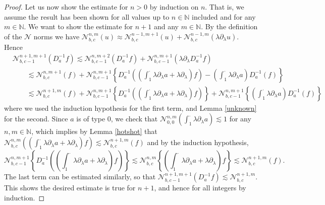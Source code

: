 \documentclass[11 pt]{amsart}
\theoremstyle{definition}
\theoremstyle{remark}
\numberwithin{equation}{section}
\begin{document}
\begin{proof}
Let us now show the estimate for $n>0$ by induction on $n$. That is, we assume the result has been shown for all values up to $n \in \mathbb{N}$ included and for any $m \in \mathbb{N}$. We want to show the estimate for $n+1$ and any $m \in \mathbb{N}$. By the definition of the $\mathcal N$ norms we have $\mathcal N^{n,m}_{b,c}(u)\approx \mathcal N^{n-1,m+1}_{b,c}(u)+\mathcal N^{n-1,m}_{b,c}(\lambda \partial_\lambda u)$. Hence
\begin{align*}
& \mathcal N^{n+1,m+1}_{b,c-1}(D_a^{-1}f)\lesssim \mathcal N^{n,m+2}_{b,c-1}(D_a^{-1}f)+\mathcal N^{n,m+1}_{b,c-1}(\lambda\partial_{\lambda}D_a^{-1}f)\\
&\qquad  \lesssim \mathcal N^{n,m+1}_{b,c}(f)+\mathcal N^{n,m+1}_{b,c-1}\left\{D_a^{- 1} \left( \left( \int_1^\cdot \lambda \partial_{\lambda} a +
    \lambda \partial_{\lambda} \right) f \right)-\left( \int_1^\cdot \lambda \partial_{\lambda} a \right) D_a^{- 1} (f) \right\}\\
    &\qquad  \lesssim \mathcal N^{n+1,m}_{b,c}(f)+\mathcal N^{n,m+1}_{b,c-1}\left\{D_a^{- 1} \left( \left( \int_1^\cdot \lambda \partial_{\lambda} a +
    \lambda \partial_{\lambda} \right) f \right)\right\}+\mathcal N^{n,m+1}_{b,c-1}\left\{\left( \int_1^\cdot \lambda \partial_{\lambda} a \right) D_a^{- 1} (f) \right\}
\end{align*}
where we used the induction hypothesis for the first term, and Lemma \ref{unknown} for the second.  Since $a$ is of type $0$, we check that $\mathcal{N}_{0, 0}^{n, m} \left(
  \int_1^\cdot \lambda \partial_{\lambda} a \right) \lesssim 1$ for any $n, m \in
  \mathbb{N}$, which implies by Lemma \ref{hotshot} that $ \mathcal{N}_{b, c}^{n, m} \left( \left( \int_1^\cdot \lambda
     \partial_{\lambda} a + \lambda \partial_{\lambda} \right) f \right)
     \lesssim \mathcal{N}_{b, c}^{n+1, m} (f) $ and by the induction hypothesis,
$$
\mathcal N^{n,m+1}_{b,c-1}\left\{D_a^{- 1} \left( \left( \int_1^\cdot \lambda \partial_{\lambda} a +
    \lambda \partial_{\lambda} \right) f \right)\right\} \lesssim \mathcal N^{n,m}_{b,c}\left\{ \left( \int_1^\cdot \lambda \partial_{\lambda} a +
    \lambda \partial_{\lambda} \right) f \right\}\lesssim \mathcal{N}_{b, c}^{n+1, m} (f).
$$
The last term can be estimated similarly, so that $\mathcal N^{n+1,m+1}_{b,c-1}(D_a^{-1}f)\lesssim \mathcal{N}_{b, c}^{n+1, m}$. This shows the desired estimate is true for $n+1$, and hence for all integers by induction.


\medskip
  

\end{proof}
\end{document}
